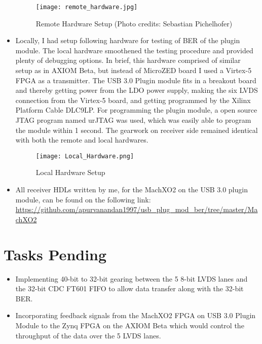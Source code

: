 \documentclass[11pt,oneside,fleqn]{book} %
\begin{document}
\begin{itemize}
\begin{figure}[h!]
\centering\texttt{[image: remote\_hardware.jpg]}
\caption{Remote Hardware Setup (Photo credits: Sebastian Pichelhofer)}
\end{figure}
\item Locally, I had setup  following hardware for testing of BER of the plugin module. The local hardware smoothened the testing procedure and provided plenty of debugging options. In brief, this hardware comprised of similar setup as in AXIOM Beta, but instead of MicroZED board I used a Virtex-5 FPGA as a transmitter. The USB 3.0 Plugin module fits in a breakout board and thereby getting power from the LDO power supply, making the six LVDS connection from the Virtex-5 board, and getting programmed by the Xilinx Platform Cable DLC9LP. For programming the plugin module, a open source JTAG program named urJTAG was used, which was easily able to program the module within 1 second. The gearwork on receiver side remained identical with both the remote and local hardwares. 
\begin{figure}[h!]
\centering\texttt{[image: Local\_Hardware.png]}
\caption{Local Hardware Setup}
\end{figure}

\item All receiver HDLs written by me, for the MachXO2 on the USB 3.0 plugin module, can be found on the following link:\\
\textcolor{blue}{\url{https://github.com/apurvanandan1997/usb_plug_mod_ber/tree/master/MachXO2}} \\
\end{itemize}

\section{Tasks Pending}
\begin{itemize}
\item Implementing 40-bit to 32-bit gearing between the 5 8-bit LVDS lanes and the 32-bit CDC FT601 FIFO to allow data transfer along with the 32-bit BER. 
\item Incorporating feedback signals from the MachXO2 FPGA on USB 3.0 Plugin Module to the Zynq FPGA on the AXIOM Beta which would control the throughput of the data over the 5 LVDS lanes. 
\end{itemize}
\end{document}
